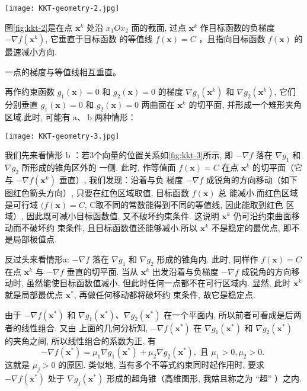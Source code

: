 \begin{FigureCenter}{}
    \label{fig:kkt-2}
    \texttt{[image: KKT-geometry-2.jpg]}
\end{FigureCenter}

图\ref{fig:kkt-2}是在点 $ \mathbf{x}^{k} $ 处沿 $ x_{1} O x_{2} $ 面的截面, 过点 $ \mathbf{x}^{k} $ 作目标函数的负梯度 $ -\nabla f\left(\mathbf{x}^{k}\right) $, 它垂直于目标函数 的等值线 $ f(\mathbf{x})=C $ ，且指向目标函数 $ f(\mathbf{x}) $ 的最速减小方向.

\begin{corollary}
    一点的梯度与等值线相互垂直。
\end{corollary}

再作约束函数 $ g_{1}(\mathbf{x})=0 $ 和 $ g_{2}(\mathbf{x})=0 $ 的梯度 $ \nabla g_{1}\left(\mathbf{x}^{k}\right) $ 和 $ \nabla g_{2}\left(\mathbf{x}^{k}\right) $, 它们分别垂直 $ g_{1}(\mathbf{x})=0 $ 和 $ g_{2}(\mathbf{x})=0 $ 两曲面在 $ \mathbf{x}^{k} $ 的切平面, 并形成一个雉形夹角区域.此时, 可能有 $ \mathrm{a} 、 \mathrm{~b} $ 两种情形：

\begin{FigureCenter}{}
    \label{fig:kkt-3}
    \texttt{[image: KKT-geometry-3.jpg]}
\end{FigureCenter}

我们先来看情形 $\mathrm{b}$ ：若3个向量的位置关系如\ref{fig:kkt-3}所示, 即 $-\nabla f$ 落在 $\nabla g_{1}$ 和 $\nabla g_{2}$ 所形成的锥角区外的 一侧. 此时, 作等值面 $f(\mathbf{x})=C$ 在点 $\mathbf{x}^{k}$ 的切平面（它与 $-\nabla f\left(\mathbf{x}^{k}\right)$ 垂直）, 我们发现：沿着与负 梯度 $-\nabla f$ 成锐角的方向移动（如下图红色箭头方向）, 只要在红色区域取值, 目标函数 $f(\mathbf{x})$ 总 能减小.而红色区域是可行域 $(f(\mathbf{x})=C$, C取不同的常数能得到不同的等值线, 因此能取到红色 区域）, 因此既可减小目标函数值, 又不破坏约束条件. 这说明 $\mathbf{x}^{k}$ 仍可沿约束曲面移动而不破坏约 束条件, 且目标函数值还能够减小.所以 $\mathbf{x}^{k}$ 不是稳定的最优点, 即不是局部极值点.

反过头来看情形a: $ -\nabla f $ 落在 $ \nabla g_{1} $ 和 $ \nabla g_{2} $ 形成的锥角内. 此时, 同样作 $ f(\mathbf{x})=C $ 在点 $ \mathbf{x}^{k} $ 与 $ -\nabla f $ 垂直的切平面. 当从 $ \mathbf{x}^{k} $ 出发沿着与负梯度 $ -\nabla f $ 成锐角的方向移动时, 虽然能使目标函数值减小, 但此时任何一点都不在可行区域内. 显然, 此时 $ \mathbf{x}^{k} $ 就是局部最优点 $ \mathbf{x}^{*} $, 再做任何移动都将破坏约 束条件, 故它是稳定点.

由于 $ -\nabla f\left(\mathbf{x}^{*}\right) $ 和 $ \nabla g_{1}\left(\mathbf{x}^{*}\right) 、 \nabla g_{2}\left(\mathbf{x}^{*}\right) $ 在一个平面内, 所以前者可看成是后两者的线性组合. 又由 上面的几何分析知, $ -\nabla f\left(\mathbf{x}^{*}\right) $ 在 $ \nabla g_{1}\left(\mathbf{x}^{*}\right) $ 和 $ \nabla g_{2}\left(\mathbf{x}^{*}\right) $ 的夹角之间, 所以线性组合的系数为正, 有
$$
-\nabla f\left(\mathbf{x}^{*}\right)=\mu_{1} \nabla g_{1}\left(\mathbf{x}^{*}\right)+\mu_{2} \nabla g_{2}\left(\mathbf{x}^{*}\right), \text { 且 } \mu_{1}>0, \mu_{2}>0 \text {. }
$$
这就是 $ \mu_{j}>0 $ 的原因. 类似地, 当有多个不等式约束同时起作用时, 要求 $ -\nabla f\left(\mathbf{x}^{*}\right) $ 处于 $ \nabla g_{j}\left(\mathbf{x}^{*}\right) $ 形成的超角锥（高维图形, 我姑且称之为 “超” ）之内.


